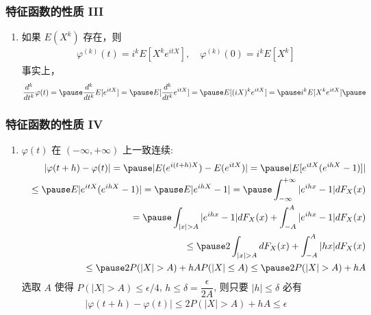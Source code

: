 \documentclass[Prob-All.tex]{subfiles}
\begin{document}
\begin{frame}
	\frametitle{特征函数的性质 III}

	\begin{enumerate}
		\item[7.] 如果 $E (X^k)$ 存在，则
		\begin{eqnarray*}
			\varphi^{(k)}(t)=i^kE[X^ke^{itX}], \quad     \varphi^{(k)}(0)=i^kE[X^k]
		\end{eqnarray*}
		事实上，
		\begin{eqnarray*}
			\dfrac{d^k}{dt^k}\varphi(t)=\pause  \dfrac{d^k}{dt^k}E[e^{itX}]=\pause E[\dfrac{d^k}{dt^k}e^{itX}]=\pause E[(iX)^ke^{itX}]=\pause i^kE[X^ke^{itX}]\pause
		\end{eqnarray*}
	\end{enumerate}
\end{frame}
\begin{frame}
	\frametitle{特征函数的性质 IV}

	\begin{enumerate}
		\item[8.] $\varphi (t)$ 在 $(-\infty,+\infty)$ 上一致连续:
		\begin{eqnarray*}
			&&|\varphi(t+h)-\varphi(t)|=\pause |E(e^{i(t+h)X})-E(e^{itX})|=\pause |E[e^{itX}(e^{ihX}-1)]|\\
			&&\le\pause E|e^{itX}(e^{ihX}-1)|=\pause E|e^{ihX}-1|=\pause \int_{-\infty}^{+\infty}|e^{ihx}-1|dF_X(x)\\
			&&=\pause \int_{|x|>A}|e^{ihx}-1|dF_X(x)+\int_{-A}^A|e^{ihx}-1|dF_X(x)\\
			&&\le\pause 2 \int_{|x|>A}dF_X(x)+\int_{-A}^A|hx|dF_X(x)\\
			&&\le\pause 2P(|X|>A)+hAP(|X|\le A)\le \pause 2P(|X|>A)+hA
		\end{eqnarray*}
		\pause 选取 $A$ 使得 $P (|X|>A)\le \epsilon/4$, $h\le \delta=\dfrac{\epsilon}{2A}$, 则只要 $|h|\le \delta$ 必有
		\pause \begin{eqnarray*}
			|\varphi(t+h)-\varphi(t)|\le 2P(|X|>A)+hA\le \epsilon
		\end{eqnarray*}
	\end{enumerate}
\end{frame}
\end{document}

